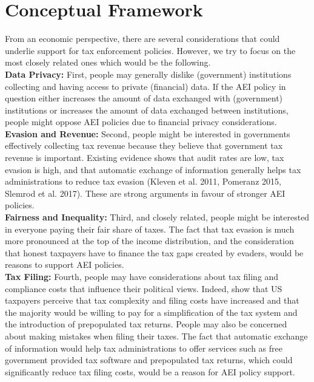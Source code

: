 \documentclass[11pt]{article}
\begin{document}
\section{Conceptual Framework} From an economic perspective, there are several considerations that could underlie support for tax enforcement policies. However, we try to focus on the most closely related ones which would be the following. \\[0.5em]
\textbf{Data Privacy:} First, people may generally dislike (government) institutions collecting and having access to private (financial) data. If the AEI policy in question either increases the amount of data exchanged with (government) institutions or increases the amount of data exchanged between institutions, people might oppose AEI policies due to financial privacy considerations. \\[0.5em]
\textbf{Evasion and Revenue:} Second, people might be interested in governments effectively collecting tax revenue because they believe that government tax revenue is important. Existing evidence shows that audit rates are low, tax evasion is high, and that automatic exchange of information generally helps tax administrations to reduce tax evasion (Kleven et al. 2011, Pomeranz 2015, Slemrod et al. 2017). These are strong arguments in favour of stronger AEI policies. \\[0.5em]
\textbf{Fairness and Inequality:} Third, and closely related, people might be interested in everyone paying their fair share of taxes. The fact that tax evasion is much more pronounced at the top of the income distribution, and the consideration that honest taxpayers have to finance the tax gaps created by evaders, would be reasons to support AEI policies. \\[0.5em]
\textbf{Tax Filing:} Fourth, people may have considerations about tax filing and compliance costs that influence their political views. Indeed, \textcite{benzarti2024rising} show that US taxpayers perceive that tax complexity and filing costs have increased and that the majority would be willing to pay for a simplification of the tax system and the introduction of prepopulated tax returns. People may also be concerned about making mistakes when filing their taxes. The fact that automatic exchange of information would help tax administrations to offer services such as free government provided tax software and prepopulated tax returns, which could significantly reduce tax filing costs, would be a reason for AEI policy support. \\[0.5em]
\end{document}
